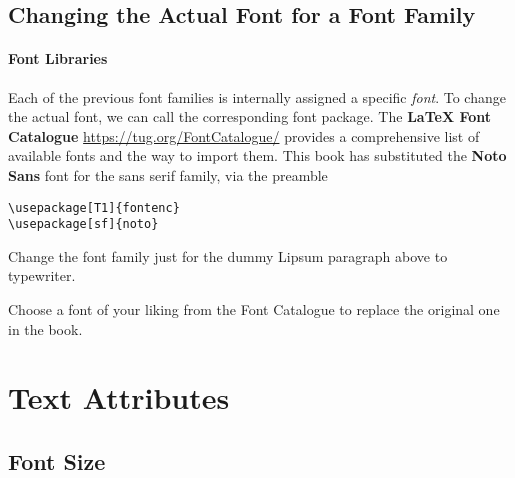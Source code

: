 \subsection{Changing the Actual Font for a Font Family}

\paragraph{Font Libraries}
Each of the previous font families is internally assigned a specific \textit{font}. To change the actual font, we can call the corresponding font package. The \textbf{\LaTeX{} Font Catalogue} \href{https://tug.org/FontCatalogue/}{https://tug.org/FontCatalogue/} provides a comprehensive list of available fonts and the way to import them. This book has substituted the \textbf{Noto Sans} font for the sans serif family, via the preamble
\begin{lstlisting}
\usepackage[T1]{fontenc}
\usepackage[sf]{noto}
\end{lstlisting}

\begin{exercisebox}
\begin{Exercise}
Change the font family just for the dummy Lipsum paragraph above to typewriter.
\end{Exercise}
\begin{Exercise}
Choose a font of your liking from the Font Catalogue to replace the original one in the book.
\end{Exercise}
\end{exercisebox}

\section{Text Attributes}

\subsection{Font Size}

